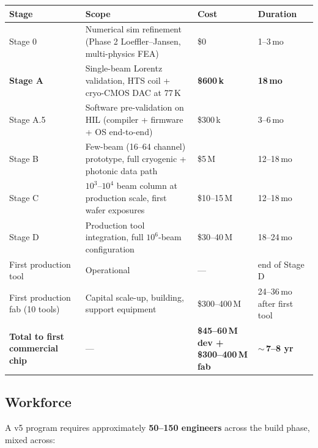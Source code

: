 \documentclass[11pt,letterpaper]{article}
\begin{document}
\begin{center}
\small
\begin{tabular}{p{}p{}p{}p{}}
\toprule
Stage & Scope & Cost & Duration \\
\midrule
Stage 0 & Numerical sim refinement (Phase 2 Loeffler--Jansen, multi-physics FEA) & \$0 & 1--3\,mo \\
\textbf{Stage A} & Single-beam Lorentz validation, HTS coil + cryo-CMOS DAC at 77\,K & \textbf{\$600\,k} & \textbf{18\,mo} \\
Stage A.5 & Software pre-validation on HIL (compiler + firmware + OS end-to-end) & \$300\,k & 3--6\,mo \\
Stage B & Few-beam (16--64 channel) prototype, full cryogenic + photonic data path & \$5\,M & 12--18\,mo \\
Stage C & $10^3$--$10^4$ beam column at production scale, first wafer exposures & \$10--15\,M & 12--18\,mo \\
Stage D & Production tool integration, full $10^6$-beam configuration & \$30--40\,M & 18--24\,mo \\
First production tool & Operational & --- & end of Stage D \\
First production fab (10 tools) & Capital scale-up, building, support equipment & \$300--400\,M & 24--36\,mo after first tool \\
\midrule
\textbf{Total to first commercial chip} & --- & \textbf{\$45--60\,M dev + \$300--400\,M fab} & \textbf{$\sim$\,7--8 yr} \\
\bottomrule
\end{tabular}
\end{center}

\subsection{Workforce}

A v5 program requires approximately \textbf{50--150 engineers} across the build phase, mixed across:
\end{document}
